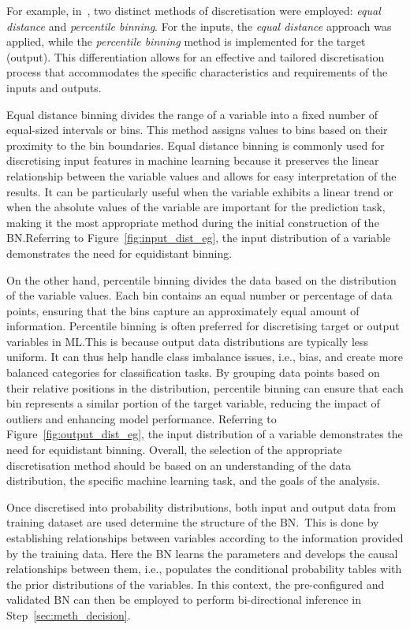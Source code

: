 \documentclass[journal]{IEEEtran}
\begin{document}
For example, in~\cite{Griffiths2024}, two distinct methods of discretisation were employed: \textit{equal distance} and \textit{percentile binning}. For the inputs, the \textit{equal distance} approach was applied, while the \textit{percentile binning} method is implemented for the target (output). This differentiation allows for an effective and tailored discretisation process that accommodates the specific characteristics and requirements of the inputs and outputs.

Equal distance binning divides the range of a variable into a fixed number of equal-sized intervals or bins\@. This method assigns values to bins based on their proximity to the bin boundaries. Equal distance binning is commonly used for discretising input features in machine learning because it preserves the linear relationship between the variable values and allows for easy interpretation of the results. It can be particularly useful when the variable exhibits a linear trend or when the absolute values of the variable are important for the prediction task, making it the most appropriate method during the initial construction of the BN.\@ Referring to Figure~\ref{fig:input_dist_eg}, the input distribution of a variable demonstrates the need for equidistant binning.

On the other hand, percentile binning divides the data based on the distribution of the variable values. Each bin contains an equal number or percentage of data points, ensuring that the bins capture an approximately equal amount of information. Percentile binning is often preferred for discretising target or output variables in ML.\@ This is because output data distributions are typically less uniform. It can thus help handle class imbalance issues, i.e., bias, and create more balanced categories for classification tasks. By grouping data points based on their relative positions in the distribution, percentile binning can ensure that each bin represents a similar portion of the target variable, reducing the impact of outliers and enhancing model performance. Referring to Figure~\ref{fig:output_dist_eg}, the input distribution of a variable demonstrates the need for equidistant binning.  Overall, the selection of the appropriate discretisation method should be based on an understanding of the data distribution, the specific machine learning task, and the goals of the analysis. 

Once discretised into probability distributions, both input and output data from training dataset are used determine the structure of the BN.~This is done by establishing relationships between variables according to the information provided by the training data. Here the BN learns the parameters and develops the causal relationships between them, i.e., populates the conditional probability tables with the prior distributions of the variables. In this context, the pre-configured and validated BN can then be employed to perform bi-directional inference in Step~\ref{sec:meth_decision}.
\end{document}
